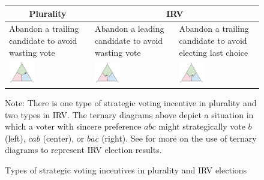 \documentclass[11pt,a4paper]{article}
\begin{document}
\begin{figure}  \caption{Types of strategic voting incentives in plurality and IRV elections \label{fig:three_types}}    
\begin{center} 
\onehalfspacing
\begin{tabular}{p{5cm} || p{5cm} | p{5cm}}
\multicolumn{1}{c||}{\textbf{Plurality}} & \multicolumn{2}{c}{ \textbf{IRV}}  \\ 
  \hline Abandon a trailing candidate to avoid wasting vote &  Abandon a leading candidate to avoid wasting vote & Abandon a trailing candidate to avoid electing last choice \\ 
\includegraphics[width=0.33\textwidth]{./../../output/figs/20190423/plurality_illustration.pdf} & \includegraphics[width=0.33\textwidth]{./../../output/figs/20190423/irv_illustration_1.pdf} & \includegraphics[width=0.33\textwidth]{./../../output/figs/20190423/irv_illustration_2.pdf}
\end{tabular} 
\end{center} 
\footnotesize{Note: There is one type of strategic voting incentive in plurality and two types in IRV. The ternary diagrams above depict a situation in which a voter with sincere preference $abc$ might strategically vote $b$ (left), $cab$ (center), or $bac$ (right). See \citet{eggersternary} for more on the use of ternary diagrams to represent IRV election results.} 
\end{figure} 
\end{document}
